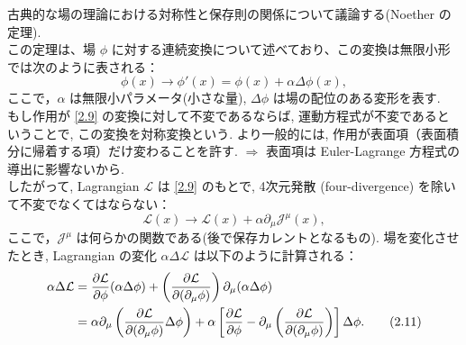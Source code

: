 \documentclass[a4paper,12pt]{article}
\begin{document}
古典的な場の理論における対称性と保存則の関係について議論する(Noether の定理).\\
この定理は、場 $\phi$ に対する連続変換について述べており、この変換は無限小形では次のように表される：
\begin{equation}\label{2.9}
\phi(x) \to \phi'(x) = \phi(x) + \alpha \Delta \phi(x),
\tag{2.9}
\end{equation}
ここで，$\alpha$ は無限小パラメータ(小さな量), $\Delta \phi$ は場の配位のある変形を表す.\\
もし作用が \eqref{2.9} の変換に対して不変であるならば, 運動方程式が不変であるということで, この変換を対称変換という.
より一般的には, 作用が表面項（表面積分に帰着する項）だけ変わることを許す. $\Longrightarrow$ 表面項は Euler-Lagrange 方程式の導出に影響ないから.\\
したがって, Lagrangian $\mathcal{L}$ は \eqref{2.9} のもとで, 4次元発散 (four-divergence) を除いて不変でなくてはならない：
\begin{equation*}\label{2.10}
\mathcal{L}(x) \to \mathcal{L}(x) + \alpha \partial_\mu \mathcal{J}^\mu(x),
\tag{2.10}
\end{equation*}
ここで，$\mathcal{J}^\mu$ は何らかの関数である(後で保存カレントとなるもの).
場を変化させたとき, Lagrangian の変化 $\alpha \Delta \mathcal{L}$ は以下のように計算される：
\begin{align*}
\alpha \Delta \mathcal{L} &= \frac{\partial \mathcal{L}}{\partial \phi} (\alpha \Delta \phi) + \left( \frac{\partial \mathcal{L}}{\partial (\partial_\mu \phi)} \right) \partial_\mu (\alpha \Delta \phi) \notag \\
&= \alpha \partial_\mu \left( \frac{\partial \mathcal{L}}{\partial (\partial_\mu \phi)} \Delta \phi \right) + \alpha \left[ \frac{\partial \mathcal{L}}{\partial \phi} - \partial_\mu \left( \frac{\partial \mathcal{L}}{\partial (\partial_\mu \phi)} \right) \right] \Delta \phi.
\label{2.11}\tag{2.11}
\end{align*}

\color{blue}
\end{document}
